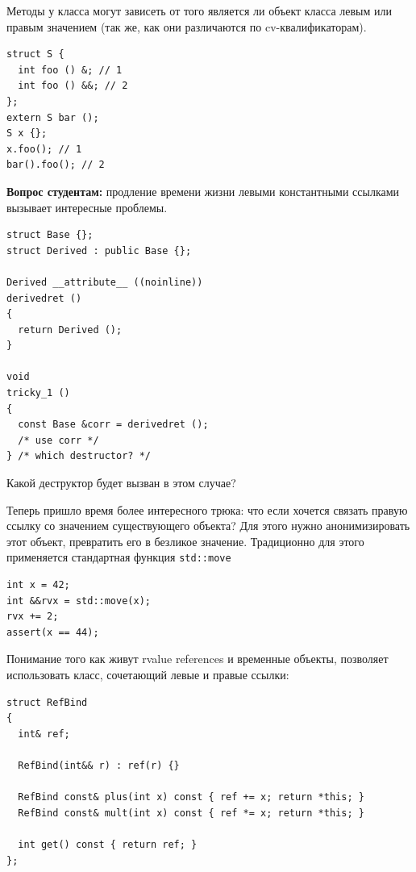 \documentclass[a4paper,12pt,oneside]{book}
\newif\ifanswers
\begin{document}
Методы у класса могут зависеть от того является ли объект класса левым или правым значением (так же, как они различаются по cv-квалификаторам).

\begin{lstlisting}
struct S {
  int foo () &; // 1
  int foo () &&; // 2
};
extern S bar ();
S x {};
x.foo(); // 1
bar().foo(); // 2
\end{lstlisting}

\textbf{Вопрос студентам:} продление времени жизни левыми константными ссылками вызывает интересные проблемы.

\begin{lstlisting}
struct Base {};
struct Derived : public Base {};

Derived __attribute__ ((noinline))
derivedret ()
{
  return Derived ();
}

void
tricky_1 ()
{
  const Base &corr = derivedret ();
  /* use corr */
} /* which destructor? */
\end{lstlisting}

Какой деструктор будет вызван в этом случае? 

\ifanswers
Правильный ответ: Оказывается статический тип временного объекта известен компилятору и будет вызван деструктор класса \lstinline!Derived!. То есть ссылки не требуют виртуальных деструкторов для своей диспетчеризации -- компилятор сам может построить верный код удаления.
\fi

Теперь пришло время более интересного трюка: что если хочется связать правую ссылку со значением существующего объекта? Для этого нужно анонимизировать этот объект, превратить его в безликое значение. Традиционно для этого применяется стандартная функция \lstinline!std::move!

\begin{lstlisting}
int x = 42;
int &&rvx = std::move(x);
rvx += 2; 
assert(x == 44);
\end{lstlisting}

Понимание того как живут rvalue references и временные объекты, позволяет использовать класс, сочетающий левые и правые ссылки:

\begin{lstlisting}
struct RefBind
{
  int& ref;

  RefBind(int&& r) : ref(r) {}

  RefBind const& plus(int x) const { ref += x; return *this; }
  RefBind const& mult(int x) const { ref *= x; return *this; }

  int get() const { return ref; }
};
\end{lstlisting}
\end{document}

